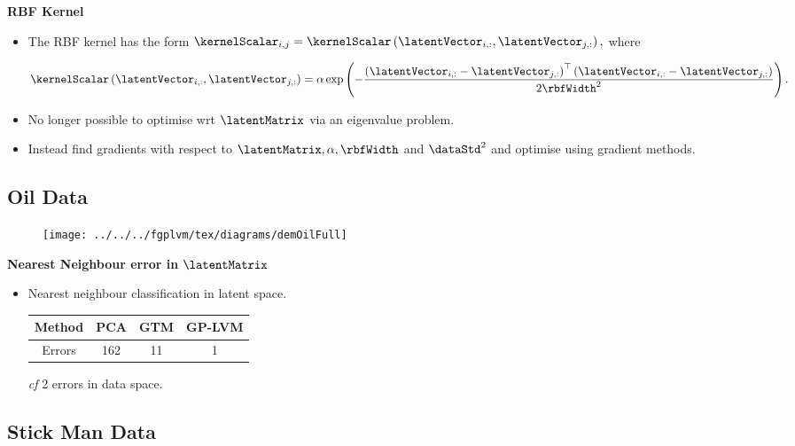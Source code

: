 \textbf{RBF Kernel}
\begin{itemize}
\item The RBF kernel has the form $\kernelScalar_{i,j}=\kernelScalar\left(\latentVector_{i,:},\latentVector_{j,:}\right),$
where


\[
\kernelScalar\left(\latentVector_{i,:},\latentVector_{j,:}\right)=\alpha\exp\left(-\frac{\left(\latentVector_{i,:}-\latentVector_{j,:}\right)^{\top}\left(\latentVector_{i,:}-\latentVector_{j,:}\right)}{2\rbfWidth^{2}}\right).\]


\item No longer possible to optimise wrt $\latentMatrix$ via an eigenvalue
problem.
\item Instead find gradients with respect to $\latentMatrix,\alpha,\rbfWidth$
and $\dataStd^{2}$ and optimise using gradient methods.
\end{itemize}

\subsection{Oil Data}


%
\begin{figure}
\centering{}\texttt{[image: ../../../fgplvm/tex/diagrams/demOilFull]}
\end{figure}



\textbf{Nearest Neighbour error in }$\latentMatrix$
\begin{itemize}
\item Nearest neighbour classification in latent space.


\begin{center}
\begin{tabular}{|c|c|c|c|}
\hline 
Method & PCA & GTM & GP-LVM\tabularnewline
\hline
Errors & 162 & 11 & 1 \tabularnewline
\hline
\end{tabular}
\par\end{center}

\begin{center}
\emph{cf} 2 errors in data space.
\par\end{center}

\end{itemize}

\subsection{Stick Man Data}

